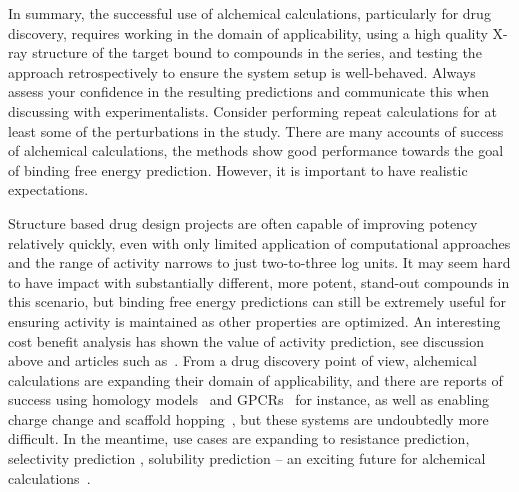 \documentclass[9pt,bestpractices,pubversion]{livecoms}
\begin{document}
In summary, the successful use of alchemical calculations, particularly for drug discovery, requires working in the domain of applicability, using a high quality X-ray structure of the target bound to compounds in the series, and testing the approach retrospectively to ensure the system setup is well-behaved. Always assess your confidence in the resulting predictions and communicate this when discussing with experimentalists. Consider performing repeat calculations for at least some of the perturbations in the study. 
 There are many accounts of success of alchemical calculations, the methods show good performance towards the goal of binding free energy prediction. However, it is important to have realistic expectations. 

Structure based drug design projects are often capable of improving potency relatively quickly, even with only limited application of computational approaches and the range of activity narrows to just two-to-three log units. It may seem hard to have impact with substantially different, more potent, stand-out compounds in this scenario, but binding free energy predictions can still be extremely useful for ensuring activity is maintained as other properties are optimized. An interesting cost benefit analysis has shown the value of activity prediction, see discussion above and articles such as~\cite{mobley2012perspective}. 
From a drug discovery point of view, alchemical calculations are expanding their domain of applicability, and there are reports of success using homology models~\cite{cappel2016relative} and GPCRs~\cite{deflorian2020accurate,lenselink2016predicting} for instance, as well as enabling charge change and scaffold hopping~\cite{chen2018accurate, wang2017accurate}, but these systems are undoubtedly more difficult. In the meantime, use cases are expanding to resistance prediction, selectivity prediction , solubility prediction – an exciting future for alchemical calculations~\cite{hauser2018predicting, albanese2020structure, mondal2019free}. 
\end{document}
